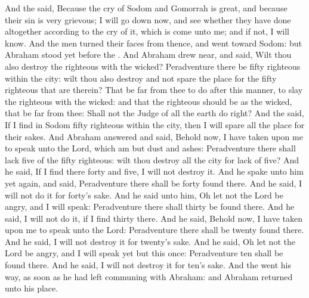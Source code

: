 \begin{biblechapter}
\verse And the \LORD said, Because the cry of Sodom and Gomorrah is great, and because their sin is very grievous;
\verse I will go down now, and see whether they have done altogether according to the cry of it, which is come unto me; and if not, I will know.
\verse And the men turned their faces from thence, and went toward Sodom: but Abraham stood yet before the \LORD.
\verse And Abraham drew near, and said, Wilt thou also destroy the righteous with the wicked?
\verse Peradventure there be fifty righteous within the city: wilt thou also destroy and not spare the place for the fifty righteous that are therein?
\verse That be far from thee to do after this manner, to slay the righteous with the wicked: and that the righteous should be as the wicked, that be far from thee: Shall not the Judge of all the earth do right?
\verse And the \LORD said, If I find in Sodom fifty righteous within the city, then I will spare all the place for their sakes.
\verse And Abraham answered and said, Behold now, I have taken upon me to speak unto the Lord, which am but dust and ashes:
\verse Peradventure there shall lack five of the fifty righteous: wilt thou destroy all the city for lack of five? And he said, If I find there forty and five, I will not destroy it.
\verse And he spake unto him yet again, and said, Peradventure there shall be forty found there. And he said, I will not do it for forty's sake.
\verse And he said unto him, Oh let not the Lord be angry, and I will speak: Peradventure there shall thirty be found there. And he said, I will not do it, if I find thirty there.
\verse And he said, Behold now, I have taken upon me to speak unto the Lord: Peradventure there shall be twenty found there. And he said, I will not destroy it for twenty's sake.
\verse And he said, Oh let not the Lord be angry, and I will speak yet but this once: Peradventure ten shall be found there. And he said, I will not destroy it for ten's sake.
\verse And the \LORD went his way, as soon as he had left communing with Abraham: and Abraham returned unto his place.
\end{biblechapter}

\flushcolsend\columnbreak %

